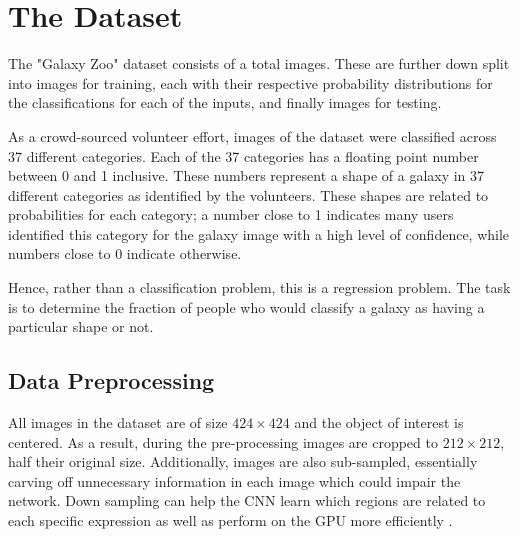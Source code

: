 \section{The Dataset}

The "Galaxy Zoo" dataset consists of a total  images. These are further down split into  images for training, each with their respective probability distributions for the classifications for each of the inputs, and finally  images for testing.

As a crowd-sourced volunteer effort, images of the dataset were classified across 37 different categories. Each of the 37 categories has a floating point number between 0 and 1 inclusive. These numbers represent a shape of a galaxy in 37 different categories as identified by the volunteers. These shapes are related to probabilities for each category; a number close to 1 indicates many users identified this category for the galaxy image with a high level of confidence, while numbers close to $0$ indicate otherwise.

Hence, rather than a classification problem, this is a regression problem. The task is to determine the fraction of people who would classify a galaxy as having a particular shape or not.

\subsection{Data Preprocessing}

All images in the dataset are of size $424 \times 424$ and the object of interest is centered. As a result, during the pre-processing images are cropped to $212 \times 212$, half their original size. Additionally, images are also sub-sampled, essentially carving off unnecessary information in each image which could impair the network. Down sampling can help the CNN learn which regions are related to each specific expression as well as perform on the GPU more efficiently \cite{deep-learning-review}.
